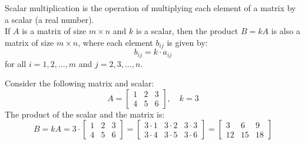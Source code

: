 \begin{definition}
    Scalar multiplication is the operation of multiplying each element of a matrix by a scalar (a real number). \\
    If \( A \) is a matrix of size \( m \times n \) and \( k \) is a scalar, then the product \( B = kA \) is also a matrix of size \( m \times n \), where each element \( b_{ij} \) is given by:
    \[
        b_{ij} = k \cdot a_{ij}
    \]
    for all \( i = 1, 2, ..., m \) and \( j = 2, 3, ..., n \).
\end{definition}
\begin{eg}
    Consider the following matrix and scalar:
    \[
        A = 
        \begin{bmatrix}
            1 & 2 & 3 \\
            4 & 5 & 6
        \end{bmatrix}
        , \quad k = 3
    \]
    The product of the scalar and the matrix is:
    \[
        B = kA = 3 \cdot
        \begin{bmatrix}
            1 & 2 & 3 \\
            4 & 5 & 6
        \end{bmatrix}
        =
        \begin{bmatrix}
            3 \cdot 1 & 3 \cdot 2 & 3 \cdot 3 \\
            3 \cdot 4 & 3 \cdot 5 & 3 \cdot 6
        \end{bmatrix}
        =
        \begin{bmatrix}
            3 & 6 & 9 \\
            12 & 15 & 18
        \end{bmatrix}
    \]
\end{eg}

